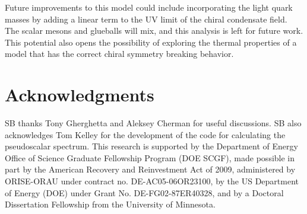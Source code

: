 \documentclass[aps,prd,12pt,nofootinbib]{revtex4}
\begin{document}
Future improvements to this model could include incorporating the light quark masses by adding a linear term to the UV limit of the chiral condensate field.
The scalar mesons and glueballs will mix, and this analysis is left for future work.
This potential also opens the possibility of exploring the thermal properties of a model that has the correct chiral symmetry breaking behavior.


\section*{Acknowledgments}
SB thanks Tony Gherghetta and Aleksey Cherman for useful discussions.  
SB also acknowledges Tom Kelley for the development of the code for calculating the pseudoscalar spectrum.
This research is supported by the Department of Energy Office of Science Graduate Fellowship Program (DOE SCGF), made possible in part by the American Recovery and Reinvestment Act of 2009, administered by ORISE-ORAU under contract no. DE-AC05-06OR23100, by the US Department of Energy (DOE) under Grant No. DE-FG02-87ER40328, and by a Doctoral Dissertation Fellowship from the University of Minnesota.

\vfill
\end{document}
